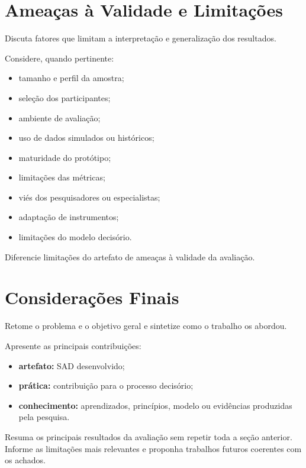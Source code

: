 \documentclass[12pt]{article}
\begin{document}
\section{Ameaças à Validade e Limitações}
\label{sec:limitacoes}

Discuta fatores que limitam a interpretação e generalização dos resultados.

Considere, quando pertinente:
\begin{itemize}[noitemsep]
    \item tamanho e perfil da amostra;
    \item seleção dos participantes;
    \item ambiente de avaliação;
    \item uso de dados simulados ou históricos;
    \item maturidade do protótipo;
    \item limitações das métricas;
    \item viés dos pesquisadores ou especialistas;
    \item adaptação de instrumentos;
    \item limitações do modelo decisório.
\end{itemize}

Diferencie limitações do artefato de ameaças à validade da avaliação.

\section{Considerações Finais}
\label{sec:consideracoes}

Retome o problema e o objetivo geral e sintetize como o trabalho os abordou.

Apresente as principais contribuições:
\begin{itemize}[noitemsep]
    \item \textbf{artefato:} SAD desenvolvido;
    \item \textbf{prática:} contribuição para o processo decisório;
    \item \textbf{conhecimento:} aprendizados, princípios, modelo ou evidências produzidas pela pesquisa.
\end{itemize}

Resuma os principais resultados da avaliação sem repetir toda a seção anterior. Informe as limitações mais relevantes e proponha trabalhos futuros coerentes com os achados.
\end{document}
